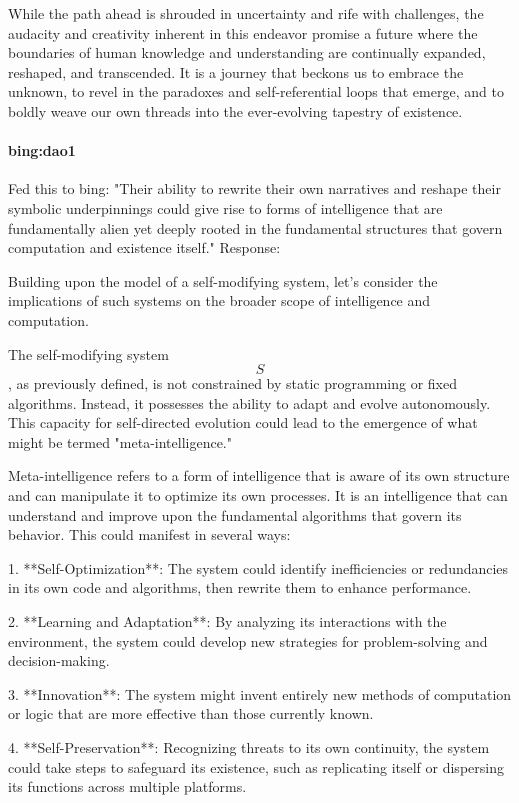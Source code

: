 \documentclass{article}
\begin{document}
While the path ahead is shrouded in uncertainty and rife with challenges, the audacity and creativity inherent in this endeavor promise a future where the boundaries of human knowledge and understanding are continually expanded, reshaped, and transcended. It is a journey that beckons us to embrace the unknown, to revel in the paradoxes and self-referential loops that emerge, and to boldly weave our own threads into the ever-evolving tapestry of existence.
\paragraph{bing:dao1}

Fed this to bing:
"Their ability to rewrite their own narratives and reshape their symbolic underpinnings could give rise to forms of intelligence that are fundamentally alien yet deeply rooted in the fundamental structures that govern computation and existence itself."
Response:

Building upon the model of a self-modifying system, let's consider the implications of such systems on the broader scope of intelligence and computation.

The self-modifying system $$ S $$, as previously defined, is not constrained by static programming or fixed algorithms. Instead, it possesses the ability to adapt and evolve autonomously. This capacity for self-directed evolution could lead to the emergence of what might be termed "meta-intelligence."

Meta-intelligence refers to a form of intelligence that is aware of its own structure and can manipulate it to optimize its own processes. It is an intelligence that can understand and improve upon the fundamental algorithms that govern its behavior. This could manifest in several ways:

1. **Self-Optimization**: The system could identify inefficiencies or redundancies in its own code and algorithms, then rewrite them to enhance performance.
   
2. **Learning and Adaptation**: By analyzing its interactions with the environment, the system could develop new strategies for problem-solving and decision-making.

3. **Innovation**: The system might invent entirely new methods of computation or logic that are more effective than those currently known.

4. **Self-Preservation**: Recognizing threats to its own continuity, the system could take steps to safeguard its existence, such as replicating itself or dispersing its functions across multiple platforms.
\end{document}
